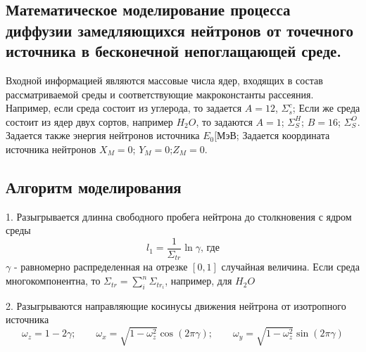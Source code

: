 \documentclass[a4paper]{article}
\begin{document}
    \subsection[Матеметическое моделирование]{Математическое
        моделирование процесса диффузии замедляющихся
        нейтронов от точечного источника в бесконечной непоглащающей
        среде.}

    Входной информацией являются массовые числа ядер, входящих в
    состав рассматриваемой среды и соответствующие макроконстанты
    рассеяния. Например, если среда состоит из углерода, то задается
    \(A=12\), $\Sigma_s^c$; Если же среда состоит из ядер двух
    сортов, например $H_2 O$, то задаются \(A=1\); $\Sigma_S^H$;
    \(B=16\); $\Sigma_S^O$. Задается также энергия нейтронов
    источника $E_0[\text{МэВ}$; Задается координата источника
    нейтронов \(X_M=0\); \(Y_M=0\);\(Z_M=0\).

    \subsection{Алгоритм моделирования}

    1. Разыгрывается длинна свободного пробега нейтрона до
    столкновения с ядром среды
    \begin{equation}\nonumber
        l_1=\frac{1}{\Sigma_{tr}}\ln{\gamma}\text{, где}
    \end{equation}
    $\gamma$ - равномерно распределенная на отрезке $[0,1]$
    случайная величина. Если среда многокомпонентна, то
    \(\Sigma_{tr}=\sum_i^n \Sigma_{tr_i}\), например, для $H_2 O$

    2. Разыгрываются направляющие косинусы движения нейтрона от
    изотропного источника
    \begin{equation}\nonumber
        \omega_z = 1 - 2\gamma;\qquad
        \omega_x = \sqrt{1 - \omega_z^2}\cos{(2\pi\gamma)};\qquad
        \omega_y = \sqrt{1 - \omega_z^2}\sin{(2\pi\gamma)}
    \end{equation}
\end{document}
